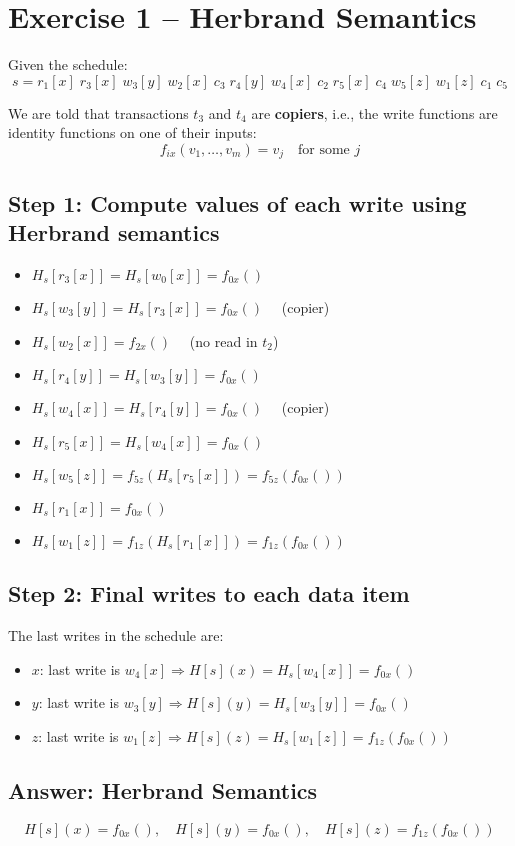 \documentclass{article}
\begin{document}
\section*{Exercise 1 – Herbrand Semantics}

Given the schedule:
\[
s = r_1[x] \; r_3[x] \; w_3[y] \; w_2[x] \; c_3 \; r_4[y] \; w_4[x] \; c_2 \; r_5[x] \; c_4 \; w_5[z] \; w_1[z] \; c_1 \; c_5
\]

We are told that transactions $t_3$ and $t_4$ are \textbf{copiers}, i.e., the write functions are identity functions on one of their inputs:
\[
f_{ix}(v_1, \dots, v_m) = v_j \quad \text{for some } j
\]

\subsection*{Step 1: Compute values of each write using Herbrand semantics}

\begin{itemize}
  \item $H_s[r_3[x]] = H_s[w_0[x]] = f_{0x}()$
  \item $H_s[w_3[y]] = H_s[r_3[x]] = f_{0x}() \quad$ (copier)

  \item $H_s[w_2[x]] = f_{2x}() \quad$ (no read in $t_2$)

  \item $H_s[r_4[y]] = H_s[w_3[y]] = f_{0x}()$
  \item $H_s[w_4[x]] = H_s[r_4[y]] = f_{0x}() \quad$ (copier)

  \item $H_s[r_5[x]] = H_s[w_4[x]] = f_{0x}()$
  \item $H_s[w_5[z]] = f_{5z}(H_s[r_5[x]]) = f_{5z}(f_{0x}())$

  \item $H_s[r_1[x]] = f_{0x}()$
  \item $H_s[w_1[z]] = f_{1z}(H_s[r_1[x]]) = f_{1z}(f_{0x}())$
\end{itemize}

\subsection*{Step 2: Final writes to each data item}

The last writes in the schedule are:
\begin{itemize}
  \item $x$: last write is $w_4[x] \Rightarrow H[s](x) = H_s[w_4[x]] = f_{0x}()$
  \item $y$: last write is $w_3[y] \Rightarrow H[s](y) = H_s[w_3[y]] = f_{0x}()$
  \item $z$: last write is $w_1[z] \Rightarrow H[s](z) = H_s[w_1[z]] = f_{1z}(f_{0x}())$
\end{itemize}

\subsection*{Answer: Herbrand Semantics}

\[
\boxed{
H[s](x) = f_{0x}(), \quad
H[s](y) = f_{0x}(), \quad
H[s](z) = f_{1z}(f_{0x}())
}
\]
\end{document}
